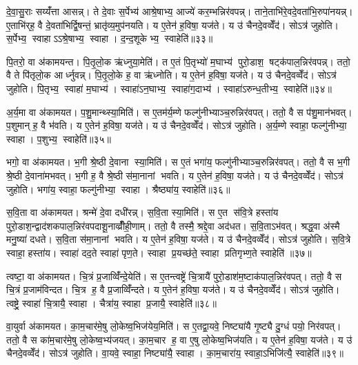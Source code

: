 दे॒वा॒सु॒राः सय्यँ॑त्ता आसन्न्। ते दे॒वाः स॒र्पेभ्य॑ आश्रे॒षाभ्य॒ आज्ये॑ कर॒म्भन्निर॑वपन्न्। ताने॒ताभि॑रे॒वदे॒वता॑भि॒रुपा॑नयन्न्। ए॒ताभि॑र्‌ह॒ वै दे॒वता॑भिर्द्वि॒षन्तं॒ भ्रातृ॑व्य॒मुप॑नयति। य ए॒तेन॑ ह॒विषा॒ यज॑ते। य उ॑ चैनदे॒वव्वेँद॑। सोऽत्र॑ जुहोति। स॒र्पेभ्य॒ स्वाहाऽऽश्रे॒षाभ्य॒ स्वाहा। द॒न्द॒शूकेभ्य॒ स्वाहेति॑॥३३॥

पि॒तरो॒ वा अ॑कामयन्त। पि॒तृ॒लो॒क ऋ॑ध्नुया॒मेति॑। त ए॒तं पि॒तृभ्यो॑ म॒घाभ्य॑ पुरो॒डाश॒ षट्क॑पाल॒न्निर॑वपन्न्। ततो॒ वै ते पि॑तृलो॒क आर्ध्नुवन्न्। पि॒तृ॒लो॒के ह॒ वा ऋ॑ध्नोति। य ए॒तेन॑ ह॒विषा॒ यज॑ते। य उ॑ चैनदे॒वव्वेँद॑। सोऽत्र॑ जुहोति। पि॒तृभ्य॒ स्वाहा॑ म॒घाभ्य॑। स्वाहा॑ऽन॒घाभ्य॒ स्वाहा॑ग॒दाभ्य॑। स्वाहा॑ऽरुन्ध॒तीभ्य॒ स्वाहेति॑॥३४॥

अ॒र्य॒मा वा अ॑कामयत। प॒शु॒मान्थ्स्या॒मिति॑। स ए॒तम॑र्य॒म्णे फल्गु॑नीभ्याञ्च॒रुन्निर॑वपत्। ततो॒ वै स प॑शु॒मान॑भवत्। प॒शुमान् ह॒ वै भ॑वति। य ए॒तेन॑ ह॒विषा॒ यज॑ते। य उ॑ चैनदे॒वव्वेँद॑। सोऽत्र॑ जुहोति। अ॒र्य॒म्णे स्वाहा॒ फल्गु॑नीभ्या॒ स्वाहा। प॒शुभ्य॒ स्वाहेति॑॥३५॥

भगो॒ वा अ॑कामयत। भ॒गी श्रे॒ष्ठी दे॒वाना स्या॒मिति॑। स ए॒तं भगा॑य॒ फल्गु॑नीभ्याञ्च॒रुन्निर॑वपत्। ततो॒ वै स भ॒गी श्रे॒ष्ठी दे॒वाना॑मभवत्। भ॒गी ह॒ वै श्रे॒ष्ठी स॑मा॒नानां भवति। य ए॒तेन॑ ह॒विषा॒ यज॑ते। य उ॑ चैनदे॒वव्वेँद॑। सोऽत्र॑ जुहोति। भगा॑य॒ स्वाहा॒ फल्गु॑नीभ्या॒ स्वाहा। श्रैष्ठ्या॑य॒ स्वाहेति॑॥३६॥

स॒वि॒ता वा अ॑कामयत। श्रन्मे॑ दे॒वा दधी॑रन्न्। स॒वि॒ता स्या॒मिति॑। स ए॒त स॑वि॒त्रे हस्ता॑य पुरो॒डाश॒न्द्वाद॑शकपाल॒न्निर॑वपदाशू॒नाव्व्रीँ॑ही॒णाम्। ततो॒ वै तस्मै॒ श्रद्दे॒वा अद॑धत। स॒वि॒ताऽभ॑वत्। श्रद्ध॒वा अ॑स्मै मनु॒ष्या॑ दधते। स॒वि॒ता स॑मा॒नानां भवति। य ए॒तेन॑ ह॒विषा॒ यज॑ते। य उ॑ चैनदे॒वव्वेँद॑। सोऽत्र॑ जुहोति। स॒वि॒त्रे स्वाहा॒ हस्ता॑य। स्वाहा॑ दद॒ते स्वाहा॑ पृण॒ते। स्वाहा प्र॒यच्छ॑ते॒ स्वाहा प्रतिगृभ्ण॒ते स्वाहेति॑ ॥३७॥

त्वष्टा॒ वा अ॑कामयत। चि॒त्रं प्र॒जाव्विँ॑न्दे॒येति॑। स ए॒तन्त्वष्ट्रे॑ चि॒त्रायै॑ पुरो॒डाश॑म॒ष्टाक॑पाल॒न्निर॑वपत्। ततो॒ वै स चि॒त्रं प्र॒जाम॑विन्दत। चि॒त्र ह॒ वै प्र॒जाव्विँ॑न्दते। य ए॒तेन॑ ह॒विषा॒ यज॑ते। य उ॑ चैनदे॒वव्वेँद॑। सोऽत्र॑ जुहोति। त्वष्ट्रे॒ स्वाहा॑ चि॒त्रायै॒ स्वाहा। चैत्रा॑य॒ स्वाहा प्र॒जायै॒ स्वाहेति॑॥३८॥

वा॒युर्वा अ॑कामयत। का॒म॒चार॑मे॒षु लो॒केष्व॒भिज॑येय॒मिति॑। स ए॒तद्वा॒यवे॒ निष्ट्या॑यै गृ॒ष्ट्यै दु॒ग्धं पयो॒ निर॑वपत्। ततो॒ वै स का॑म॒चार॑मे॒षु लो॒केष्व॒भ्य॑जयत्। का॒म॒चार ह॒ वा ए॒षु लो॒केष्व॒भिज॑यति। य ए॒तेन॑ ह॒विषा॒ यज॑ते। य उ॑ चैनदे॒वव्वेँद॑। सोऽत्र॑ जुहोति। वा॒यवे॒ स्वाहा॒ निष्ट्या॑यै॒ स्वाहा। का॒म॒चारा॑य॒ स्वाहा॒ऽभिजि॑त्यै॒ स्वाहेति॑॥३९॥

